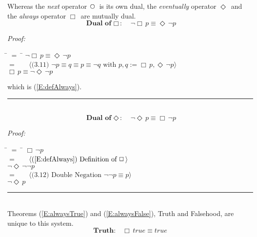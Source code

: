 \documentclass[fleqn, leqno]{article}
\newcommand{\lgap}{2pt}                             %
\newcommand{\mymathindent}{24pt}                    %
\newcommand{\Next}{\;\,\text{\raisebox{3.5pt}{\circle{6}}}}
\newcommand{\Event}{\Diamond\,}
\newcommand{\Always}{\Box\,}
\newcommand{\myqed}{\hfill\rule[-.23ex]{1.2ex}{2.0ex}}
\newcommand{\Gll} {\langle}                         %
\newcommand{\Ggg} {\rangle}                         %
\newcommand{\Hint}[1]     {\ \ \ $\Gll              \mbox{#1} \Ggg$ }   %
\begin{document}

Whereas the \textit{next} operator $\Next$ is its own dual, the \textit{eventually} operator $\Event$
and the \textit{always} operator $\Always$
are mutually dual.
\begin{equation}\label{E:dualAlways}
\textbf{Dual of $\Always$:}\quad \neg\Always p \equiv \Event\neg p
\end{equation}

\emph{Proof:}
\begin{tabbing}
\hspace{\mymathindent} \= $= \;$ \= \kill
  \> \>   $\neg\Always p \equiv \Event\neg p$\\[\lgap]
  \> $=$  \>  \Hint{(3.11) $\neg p \equiv q \equiv p \equiv \neg q$ with $p,q := \Always p, \Event\neg p$}\\[\lgap]
  \> \>   $\Always p \equiv \neg\Event\neg p$
\end{tabbing}
which is (\ref{E:defAlways}). \myqed\\[\lgap]

\begin{equation}\label{E:dualEvent}
\textbf{Dual of $\Event$:}\quad \neg\Event p \equiv \Always\neg p
\end{equation}

\emph{Proof:}
\begin{tabbing}
\hspace{\mymathindent} \= $= \;$ \= \kill
  \> \>   $\Always\neg p$\\[\lgap]
  \> $=$  \>  \Hint{(\ref{E:defAlways}) Definition of $\Always$}\\[\lgap]
  \> \>   $\neg\Event\neg\neg p$\\[\lgap]
  \> $=$  \>  \Hint{(3.12) Double Negation $\neg\neg p\equiv p$}\\[\lgap]
  \> \>   $\neg\Event p$
\end{tabbing}
\myqed\\[\lgap]

Theorems (\ref{E:alwaysTrue}) and (\ref{E:alwaysFalse}), Truth and Falsehood, are unique to this system.
\begin{equation}\label{E:alwaysTrue}
\textbf{Truth:}\quad \Always true \equiv true
\end{equation}
\end{document}
